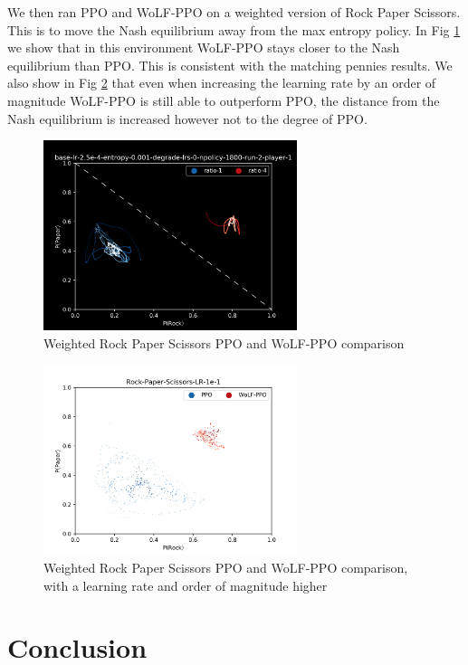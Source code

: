 \documentclass[conference]{IEEEtran}
\begin{document}
We then ran PPO and WoLF-PPO on a weighted version of Rock Paper Scissors. This is to move the Nash equilibrium away from the max entropy policy. In Fig \ref{fig:weighted-rps-ppo-e4} we show that in this environment WoLF-PPO stays closer to the Nash equilibrium than PPO. This is consistent with the matching pennies results. We also show in Fig \ref{fig:weighted-rps-ppo-e1} that even when increasing the learning rate by an order of magnitude WoLF-PPO is still able to outperform PPO, the distance from the Nash equilibrium is increased however not to the degree of PPO.

\begin{figure}
    \centering
    \includegraphics[width=20em]{Figures/weighted-rps-ppo-e4.png}
    \caption{Weighted Rock Paper Scissors PPO and WoLF-PPO comparison}
    \label{fig:weighted-rps-ppo-e4}
\end{figure}

\begin{figure}
    \centering
    \includegraphics[width=20em]{Figures/rock-paper-scissors-lr-1e-1}
    \caption{Weighted Rock Paper Scissors PPO and WoLF-PPO comparison, with a learning rate and order of magnitude higher}
    \label{fig:weighted-rps-ppo-e1}
\end{figure}

\section{Conclusion}
\end{document}
